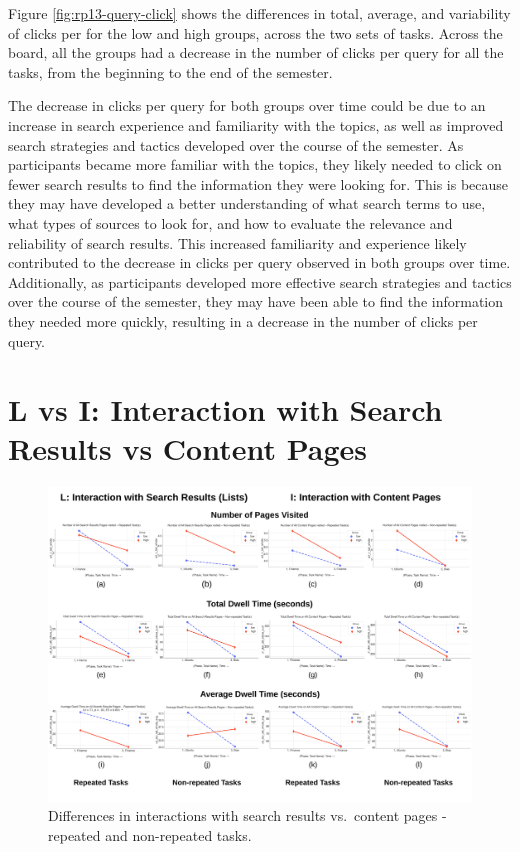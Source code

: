 \documentclass[letterpaper, nobind]{templates/ociamthesis}
\begin{document}
Figure \ref{fig:rp13-query-click} shows the differences in total, average, and variability of clicks per for the low and high groups, across the two sets of tasks.
Across the board, all the groups had a decrease in the number of clicks per query for all the tasks, from the beginning to the end of the semester.

The decrease in clicks per query for both groups over time could be due to an increase in search experience and familiarity with the topics, as well as improved search strategies and tactics developed over the course of the semester.
As participants became more familiar with the topics, they likely needed to click on fewer search results to find the information they were looking for. This is because they may have developed a better understanding of what search terms to use, what types of sources to look for, and how to evaluate the relevance and reliability of search results.
This increased familiarity and experience likely contributed to the decrease in clicks per query observed in both groups over time.
Additionally, as participants developed more effective search strategies and tactics over the course of the semester, they may have been able to find the information they needed more quickly, resulting in a decrease in the number of clicks per query.

\hypertarget{l-vs-i-interaction-with-search-results-vs-content-pages}{%
\section{L vs I: Interaction with Search Results vs Content Pages}\label{l-vs-i-interaction-with-search-results-vs-content-pages}}

\begin{figure}

{\centering \includegraphics[width=1\linewidth]{figs/rp13-lvi} 

}

\caption[Differences in interactions with search results vs.~content pages - repeated and non-repeated tasks.]{Differences in interactions with search results vs.~content pages - repeated and non-repeated tasks.}\label{fig:rp13-lvi}
\end{figure}
\end{document}
